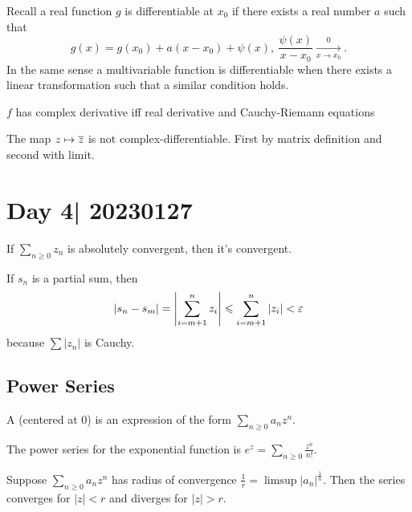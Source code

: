 \documentclass[12pt]{memoir}
\begin{document}
Recall a real function $g$ is differentiable at $x_0$ if there exists a real number $a$ such that
$$g(x)=g(x_0)+a(x-x_0)+\psi(x),\ \frac{\psi(x)}{x-x_0}\xrightarrow[x\to x_0]0.$$
In the same sense a multivariable function is differentiable when there exists a linear transformation such that a similar condition holds. 

\begin{Def}
$f$ has complex derivative iff real derivative and Cauchy-Riemann equations
\end{Def}

\begin{Ex}
    The map $z\mapsto\overline z$ is not complex-differentiable. First by matrix definition and second with limit. 
\end{Ex}

\section{Day 4| 20230127}

\begin{Lem}
If $\sum_{n\geq 0} z_n$ is absolutely convergent, then it's convergent.
\end{Lem}

\begin{ptcbp}
If $s_n$ is a partial sum, then 
$$|s_n-s_m|=\left|\sum_{i=m+1}^{n}z_i\right|\leqslant\sum_{i=m+1}^{n}|z_i|<\varepsilon$$
because $\sum|z_n|$ is Cauchy.
\end{ptcbp}

\subsection{Power Series}

\begin{Def}
    A  (centered at $0$) is an expression of the form $\sum_{n\geq 0}a_nz^n$.
\end{Def}

\begin{Ex}
    The power series for the exponential function is $e^z=\sum_{n\geq 0}\frac{z^n}{n!}$. 
\end{Ex}

\begin{Th}\label{thm-cauchy-hadamard}
Suppose $\sum_{n\geq 0}a_nz^n$ has radius of convergence $\frac{1}{r}=\limsup|a_n|^\frac{1}{n}$. Then the series converges for $|z|<r$ and diverges for $|z|>r$.
\end{Th}
\end{document}
